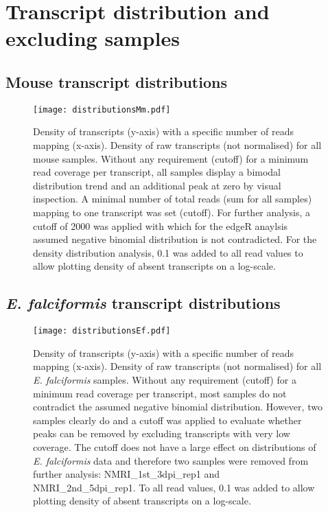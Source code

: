 \documentclass{article}
\begin{document}
\section{Transcript distribution and excluding samples}
\subsection{Mouse transcript distributions}
\begin{figure}[H]
\centering
\texttt{[image: distributionsMm.pdf]}
\caption{Density of transcripts (y-axis) with a specific number of reads mapping (x-axis). 
Density of raw transcripts (not normalised) for all mouse samples. Without any requirement 
(cutoff) for a minimum read coverage per transcript, all samples display a bimodal distribution 
trend and an additional peak at zero by visual inspection. A minimal number of total reads 
(sum for all samples) mapping to one transcript was set (cutoff). For further analysis, a cutoff of
2000 was applied with which for the edgeR anaylsis assumed negative binomial distribution is not 
contradicted. For the density distribution analysis, 0.1 was added to all read values to allow plotting 
density of absent transcripts on a log-scale.}
\end{figure}

\clearpage
\subsection{\textit{E. falciformis} transcript distributions}
\begin{figure}[H]
\begin{center}
\texttt{[image: distributionsEf.pdf]}
\caption{Density of transcripts (y-axis) with a specific number of reads mapping (x-axis). 
Density of raw transcripts (not normalised) for all \textit{E. falciformis} samples. Without any
requirement (cutoff) for a minimum read coverage per transcript, most samples do not contradict
the assumed negative binomial distribution. However, two samples clearly do and a cutoff was applied 
to evaluate whether peaks can be removed by excluding transcripts with very low coverage.
The cutoff does not have a large effect on distributions of \textit{E. falciformis} data and therefore 
two samples were removed from further analysis: NMRI\_1st\_3dpi\_rep1 and NMRI\_2nd\_5dpi\_rep1.
	To all read values, 0.1 was added to allow plotting density of absent transcripts on a log-scale.}
\end{center}
\end{figure}
\end{document}
